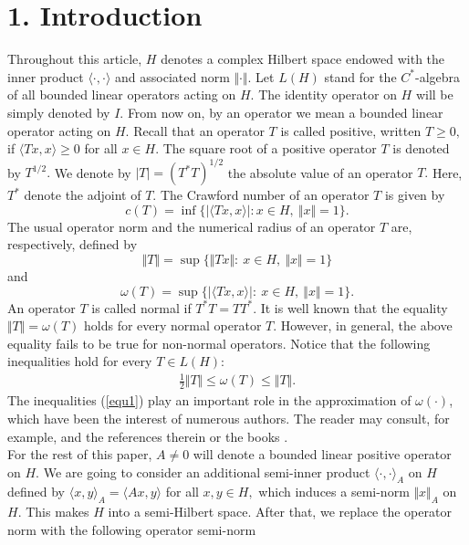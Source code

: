\documentclass[preprint,12pt,3p]{elsarticle}
\begin{document}
\noindent

\setcounter{section}{1}
\section*{\normalsize{1. Introduction}}
Throughout this article, $ H $ denotes a complex Hilbert space endowed with the inner product $ \langle \cdot , \cdot \rangle $ and associated norm $ \Vert \cdot \Vert . $ Let $ L(H) $ stand for the $ C^{*} $-algebra of all bounded linear operators acting on $ H. $ The identity operator on $ H $ will be simply denoted by $ I .$ From now on, by an operator we mean a bounded linear operator acting on $ H. $ Recall that an operator $ T $ is called positive, written $ T\geq 0, $ if $ \langle Tx,x \rangle\geq 0 $ for all $ x\in H. $ The square root of a positive operator $ T $ is denoted by $ T^{1/2}. $ We denote by $ \vert T \vert= (T^{*}T)^{1/2} $ the absolute value of an operator $ T. $ Here, $ T^{*} $ denote the adjoint of $ T. $ The Crawford number of an operator $ T $ is given by
$$
c(T)=\inf \lbrace \vert\langle Tx,x\rangle\vert:x\in H, \ \Vert x \Vert=1 \rbrace .
$$
The usual operator norm and the numerical radius of an operator $ T $ are, respectively, defined by
$$
\Vert T \Vert=\sup \lbrace \Vert Tx \Vert: \ x\in H, \  \Vert x \Vert=1 \rbrace
$$
and 
$$
\omega (T) =\sup \lbrace \vert\langle Tx,x\rangle\vert: \ x\in H, \ \Vert x \Vert=1 \rbrace .
$$
An operator $ T $ is called normal if $ T^{*}T=TT^{*}. $ It is well known that the equality $ \Vert T \Vert= \omega (T) $ holds for every normal operator $ T. $ However, in general, the above equality fails to be true for non-normal operators. Notice that the following inequalities hold for every $ T\in L(H): $
\begin{eqnarray}
\label{equ1}
\frac{1}{2}\Vert T \Vert \leq \omega (T) \leq \Vert T \Vert .
\end{eqnarray}
The inequalities (\ref{equ1}) play an important role in the approximation of $ \omega (\cdot ) $, which have been the interest of numerous authors. The reader may consult, for example, \cite{bhunia1, bhunia2, bhunia3, heydarbeygi, kittaneh, qiao} and the references therein or the  books \cite{bhunia4,GAu,KEGustafsonDKMRao1991}. \\
For the rest of this paper, $ A\neq 0 $ will denote a bounded linear positive operator on $ H. $ We are going to consider an additional semi-inner product $ \langle \cdot , \cdot \rangle_{A} $ on $ H $ defined by $ \langle x,y \rangle_{A}=\langle Ax, y \rangle $ for all $ x, y \in H, $ which induces a semi-norm  $ \Vert x \Vert_{A} $ on $ H. $ This makes $ H $ into a semi-Hilbert space. After that, we replace the operator norm with the following operator semi-norm
\end{document}

